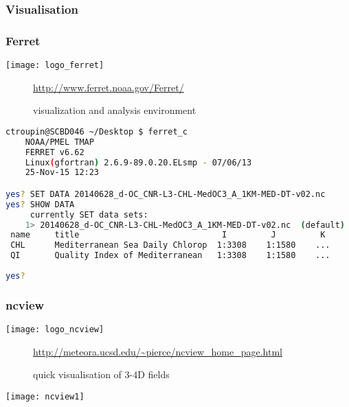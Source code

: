 \subsubsection{Visualisation}
\begin{frame}[c, fragile]
\frametitle{Ferret}

\texttt{[image: logo\_ferret]}

\begin{description}
\item[\homepage] {\scriptsize \url{http://www.ferret.noaa.gov/Ferret/}}
\item[\tool] visualization and analysis environment
\end{description}

\vfill

\begin{lstlisting}[language=bash,basicstyle=\tiny,title={Ferret to get basic info on file}]
ctroupin@SCBD046 ~/Desktop $ ferret_c 
 	NOAA/PMEL TMAP
 	FERRET v6.62  
 	Linux(gfortran) 2.6.9-89.0.20.ELsmp - 07/06/13
 	25-Nov-15 12:23     

yes? SET DATA 20140628_d-OC_CNR-L3-CHL-MedOC3_A_1KM-MED-DT-v02.nc 
yes? SHOW DATA
     currently SET data sets:
    1> 20140628_d-OC_CNR-L3-CHL-MedOC3_A_1KM-MED-DT-v02.nc  (default)
 name     title                             I         J         K         L
 CHL      Mediterranean Sea Daily Chlorop  1:3308    1:1580    ...       1:1
 QI       Quality Index of Mediterranean   1:3308    1:1580    ...       1:1
 
yes? 
\end{lstlisting}


\end{frame}

\begin{frame}[c]
\frametitle{ncview}

\texttt{[image: logo\_ncview]}

\begin{description}
\item[\homepage] {\scriptsize \url{http://meteora.ucsd.edu/~pierce/ncview_home_page.html}}
\item[\tool] quick visualisation of 3-4D fields
\end{description}

\vfill

\texttt{[image: ncview1]}

\end{frame}

